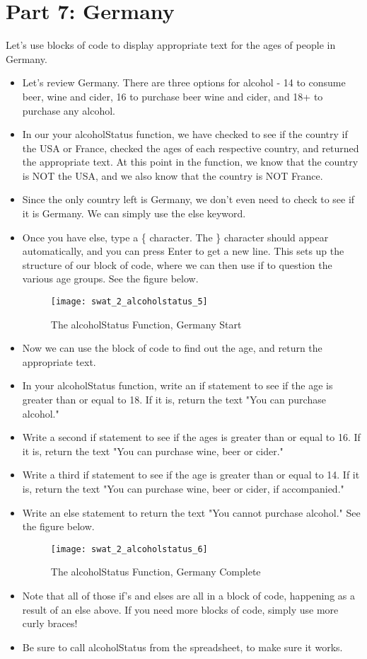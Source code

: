 \documentclass{article}
\begin{document}
\section*{Part 7: Germany}
Let's use blocks of code to display appropriate text for the ages of people in Germany.
\begin{itemize}
	\item Let's review Germany.  There are three options for alcohol - 14 to consume beer, wine and cider, 16 to purchase beer wine and cider, and 18+ to purchase any alcohol.
	\item In our your alcoholStatus function, we have checked to see if the country if the USA or France, checked the ages of each respective country, and returned the appropriate text.  At this point in the function, we know that the country is NOT the USA, and we also know that the country is NOT France.
	\item Since the only country left is Germany, we don't even need to check to see if it is Germany.  We can simply use the else keyword.
	\item Once you have else, type a \{ character.  The \} character should appear automatically, and you can press Enter to get a new line.  This sets up the structure of our block of code, where we can then use if to question the various age groups.  See the figure below.
	\begin{figure}[H]
  		\centering
  		\texttt{[image: swat\_2\_alcoholstatus\_5]}
  		\caption{The alcoholStatus Function, Germany Start}
	\end{figure}
	\item Now we can use the block of code to find out the age, and return the appropriate text.
	\item In your alcoholStatus function, write an if statement to see if the age is greater than or equal to 18.  If it is, return the text "You can purchase alcohol."
	\item Write a second if statement to see if the ages is greater than or equal to 16.  If it is, return the text "You can purchase wine, beer or cider."
	\item Write a third if statement to see if the age is greater than or equal to 14.  If it is, return the text "You can purchase wine, beer or cider, if accompanied."
	\item Write an else statement to return the text "You cannot purchase alcohol."  See the figure below.
	\begin{figure}[H]
  		\centering
  		\texttt{[image: swat\_2\_alcoholstatus\_6]}
  		\caption{The alcoholStatus Function, Germany Complete}
	\end{figure}
	\item Note that all of those if's and elses are all in a block of code, happening as a result of an else above.  If you need more blocks of code, simply use more curly braces!
	\item Be sure to call alcoholStatus from the spreadsheet, to make sure it works.
\end{itemize}
\end{document}
